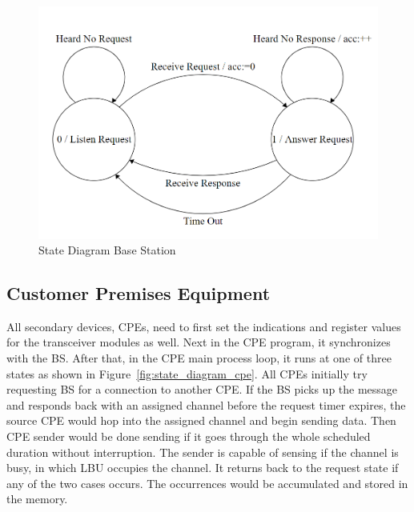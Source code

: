 \begin{figure}[ht]
\centering
\includegraphics[width=12cm]{figures/state_diagram_bs.png}
\caption{State Diagram Base Station}
\label{fig:state_diagram_bs}
\end{figure}


\subsection{Customer Premises Equipment}
All secondary devices, CPEs, need to first set the indications and register values for the transceiver modules as well. Next in the CPE program, it synchronizes with the BS. After that, in the CPE main process loop, it runs at one of three states as shown in Figure~\ref{fig:state_diagram_cpe}. All CPEs initially try requesting BS for a connection to another CPE. If the BS picks up the message and responds back with an assigned channel before the request timer expires, the source CPE would hop into the assigned channel and begin sending data. Then CPE sender would be done sending if it goes through the whole scheduled duration without interruption. The sender is capable of sensing if the channel is busy, in which LBU occupies the channel. It returns back to the request state if any of the two cases occurs. The occurrences would be accumulated and stored in the memory.

